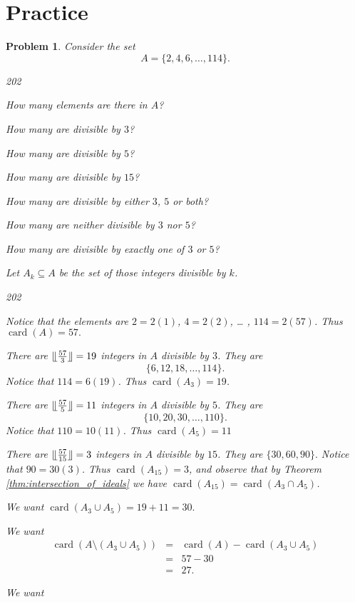 \documentclass[11pt, openany]{book}
\theoremstyle{change} \theoremheaderfont{\blue\sffamily\bfseries}
\newtheorem{pro}[thm]{Problem}
\theoremstyle{nonumberplain} \theoremheaderfont{\sffamily\bfseries}
\newcommand{\í}{\'{\i}}
\def\card#1{\operatorname{card}\left(#1\right)}
\begin{document}
\section*{Practice}
\begin{multicols}{2}\columnseprule 1pt \columnsep 25pt


\begin{pro}
Consider the set $$A = \{2,4,6, \ldots , 114\} . $$
\begin{dingautolist}{202}
\item How many elements are there in $A$?\item How many are
divisible by $3$? \item How many are divisible by $5$?  \item How
many are divisible by $15$? \item How many are divisible by either
$3$, $5$ or both? \item How many are neither divisible by $3$ nor
$5$? \item How many are divisible by exactly one of $3$ or $5$?
\end{dingautolist}
\begin{answer} Let $A_k\subseteq A$ be the set of those integers divisible by
$k$.
\begin{dingautolist}{202}
\item Notice that the elements are $2 = 2(1)$, $4 = 2(2)$, \ldots
, $114 = 2(57)$. Thus $\card{A} = 57.$ \item There are $\llfloor
\frac{57}{3}\rrfloor = 19$ integers in $A$ divisible by $3$. They
are
$$\{6, 12, 18, \ldots , 114\}.$$ Notice that $114 = 6(19)$. Thus
$\card{A_3} = 19$.  \item There are $\llfloor \frac{57}{5}\rrfloor =
11$ integers in $A$ divisible by $5$. They are $$\{10, 20, 30,
\ldots , 110\}.$$ Notice that $110 = 10(11)$. Thus $\card{A_{5}} =
11$\item There are $\llfloor \frac{57}{15}\rrfloor = 3$  integers in
$A$ divisible by $15$. They are $\{30, 60, 90\}.$ Notice that $90 =
30(3)$. Thus $\card{A_{15}} = 3 $, and observe that by Theorem
\ref{thm:intersection_of_ideals} we have $\card{A_{15}} = \card{A_3
\cap A_5}$.\item We want $\card{A_3 \cup A_5} = 19 + 11 = 30.$ \item
We want
$$\begin{array}{lll}\card{A \setminus (A_3 \cup A_5)} & = &
 \card{A} - \card{A_3 \cup
A_5} \\ &  = &  57 - 30 \\ &  = &  27.\end{array}$$ \item We want

\end{dingautolist}
\end{answer}
\end{pro}
\end{multicols}
\end{document}
